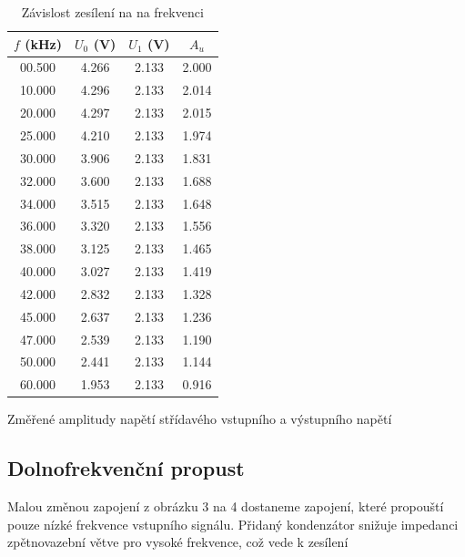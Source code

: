 \documentclass[a4paper,11pt]{article}
\begin{document}
\begin{table}[htpb]
    \begin{minipage}{.45\linewidth}
        \centering
        \begin{tabular}{| c c c c |}
            \hline
            $ f $  (kHz) & $ U_0 $ (V) & $ U_1 $ (V) & $ A_u $  \\
            \hline
            00.500 & 4.266 & 2.133 & 2.000 \\
            10.000 & 4.296 & 2.133 & 2.014 \\
            20.000 & 4.297 & 2.133 & 2.015 \\
            25.000 & 4.210 & 2.133 & 1.974 \\
            30.000 & 3.906 & 2.133 & 1.831 \\
            32.000 & 3.600 & 2.133 & 1.688 \\
            34.000 & 3.515 & 2.133 & 1.648 \\
            36.000 & 3.320 & 2.133 & 1.556 \\
            38.000 & 3.125 & 2.133 & 1.465 \\
            40.000 & 3.027 & 2.133 & 1.419 \\
            42.000 & 2.832 & 2.133 & 1.328 \\
            45.000 & 2.637 & 2.133 & 1.236 \\
            47.000 & 2.539 & 2.133 & 1.190 \\
            50.000 & 2.441 & 2.133 & 1.144 \\
            60.000 & 1.953 & 2.133 & 0.916 \\
            \hline
        \end{tabular}
        \caption{Změřené amplitudy napětí střídavého vstupního a výstupního napětí}
    \end{minipage} 
    \hfill
    \begin{minipage}{.45\linewidth}
        \centering
        \resizebox{\textwidth}{!}{  }
        \captionsetup{type=graph}
        \caption{Závislost zesílení na na frekvenci }
    \end{minipage} 
\end{table}

\subsection{Dolnofrekvenční propust}

Malou změnou zapojení z obrázku 3 na 4 dostaneme zapojení, které propouští pouze nízké frekvence vstupního signálu. Přidaný kondenzátor snižuje impedanci zpětnovazební větve pro vysoké frekvence, což vede k zesílení
\end{document}
